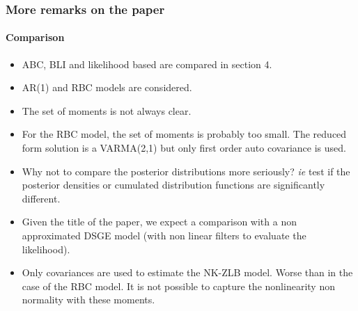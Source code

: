 \documentclass[10pt]{beamer}
\begin{document}
\begin{frame}
  \frametitle{More remarks on the paper}
  \framesubtitle{Comparison}

  \begin{itemize}

  \item ABC, BLI and likelihood based are compared in section 4.
    
  \item AR(1) and RBC models are considered.

  \item The set of moments is not always clear.

  \item For the RBC model, the set of moments is probably too
    small. The reduced form solution is a VARMA(2,1) but only first
    order auto covariance is used.

  \item Why not to compare the posterior distributions more seriously?
    \emph{ie} test if the posterior densities or cumulated distribution
    functions are significantly different.

  \item Given the title of the paper, we expect a comparison with a
    non approximated DSGE model (with non linear filters to evaluate
    the likelihood).

  \item Only covariances are used to estimate the NK-ZLB model. Worse
    than in the case of the RBC model. It is not possible to capture
    the nonlinearity non normality with these moments.
    
  \end{itemize}
\end{frame}
\end{document}
